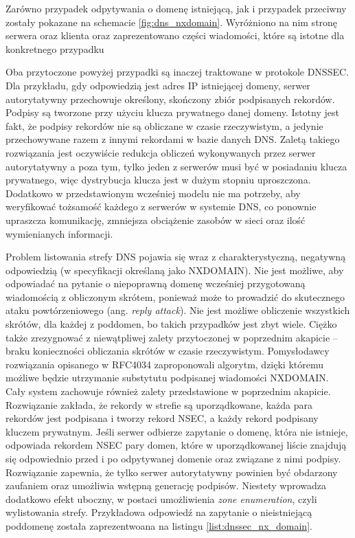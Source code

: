 Zarówno przypadek odpytywania o domenę istniejącą, jak i przypadek przeciwny zostały pokazane na schemacie \ref{fig:dns_nxdomain}.
Wyróżniono na nim stronę serwera oraz klienta oraz zaprezentowano części wiadomości, które są istotne dla konkretnego przypadku

Oba przytoczone powyżej przypadki są inaczej traktowane w protokole DNSSEC. Dla przykładu, gdy odpowiedzią jest
adres IP istniejącej domeny, serwer autorytatywny przechowuje określony, skończony zbiór podpisanych rekordów. Podpisy są tworzone
przy użyciu klucza prywatnego danej domeny. Istotny jest fakt, że podpisy rekordów nie są obliczane w czasie rzeczywistym, a jedynie
przechowywane razem z innymi rekordami w bazie danych DNS. Zaletą takiego rozwiązania jest oczywiście redukcja obliczeń wykonywanych
przez serwer autorytatywny a poza tym, tylko jeden z serwerów musi być w posiadaniu klucza prywatnego, więc dystrybucja klucza jest w
dużym stopniu uproszczona. Dodatkowo w przedstawionym wcześniej modelu nie ma potrzeby, aby weryfikować tożsamość każdego z serwerów
w systemie DNS, co ponownie upraszcza komunikację, zmniejsza obciążenie zasobów w sieci oraz ilość wymienianych informacji.

Problem listowania strefy DNS pojawia się wraz z charakterystyczną, negatywną odpowiedzią (w specyfikacji określaną jako NXDOMAIN).
Nie jest możliwe, aby odpowiadać na pytanie o niepoprawną domenę wcześniej przygotowaną wiadomością z obliczonym skrótem, ponieważ
może to prowadzić do skutecznego ataku powtórzeniowego (ang. \textit{reply attack}). Nie jest możliwe obliczenie wszystkich skrótów,
dla każdej z poddomen, bo takich przypadków jest zbyt wiele. Ciężko także zrezygnować z niewątpliwej zalety przytoczonej w poprzednim
akapicie -- braku konieczności obliczania skrótów w czasie rzeczywistym. Pomysłodawcy rozwiązania opisanego w RFC4034 \cite{RFC4034}
zaproponowali algorytm, dzięki któremu możliwe będzie utrzymanie substytutu podpisanej wiadomości NXDOMAIN. Cały system zachowuje
również zalety przedstawione w poprzednim akapicie. Rozwiązanie zakłada, że rekordy w strefie są uporządkowane, każda para rekordów
jest podpisana i tworzy rekord NSEC, a każdy rekord podpisany kluczem prywatnym. Jeśli serwer odbierze zapytanie o domenę, która
nie istnieje, odpowiada rekordem NSEC pary domen, które w uporządkowanej liście znajdują się odpowiednio przed i po odpytywanej
domenie oraz związane z nimi podpisy. Rozwiązanie zapewnia, że tylko serwer autorytatywny powinien być obdarzony zaufaniem oraz
umożliwia wstępną generację podpisów. Niestety wprowadza dodatkowo efekt uboczny, w postaci umożliwienia \textit{zone enumeration},
czyli wylistowania strefy. Przykładowa odpowiedź na zapytanie o nieistniejącą poddomenę została zaprezentwoana na listingu
\ref{list:dnssec_nx_domain}.

